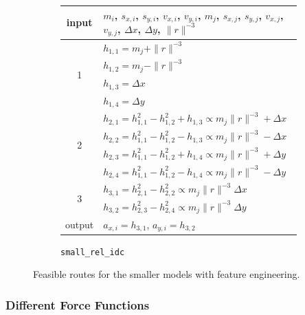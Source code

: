 \documentclass{article}
\begin{document}
\begin{figure}[H]
\begin{subfigure}{\textwidth}
\centering
\begin{tabular}{c|l}
input & $m_{i}$, $s_{x,i}$, $s_{y,i}$, $v_{x,i}$, $v_{y,i}$, $m_{j}$, $s_{x,j}$, $s_{y,j}$, $v_{x,j}$, $v_{y,j}$, $\Delta x$, $\Delta y$, $\|r\|^{-3}$ \\
\hline
\multirow{4}{*}{1} & $h_{1,1} = m_{j} + \|r\|^{-3}$ \\
& $h_{1,2} = m_{j} - \|r\|^{-3}$ \\
& $h_{1,3} = \Delta x$ \\
& $h_{1,4} = \Delta y$ \\
\hline
\multirow{4}{*}{2} & $h_{2, 1} = h_{1,1}^{2} - h_{1,2}^{2} + h_{1,3} \propto m_{j} \|r\|^{-3} + \Delta x$ \\
& $h_{2, 2} = h_{1,1}^{2} - h_{1,2}^{2} - h_{1,3} \propto m_{j} \|r\|^{-3} - \Delta x$ \\
& $h_{2, 3} = h_{1,1}^{2} - h_{1,2}^{2} + h_{1,4} \propto m_{j} \|r\|^{-3} + \Delta y$ \\
& $h_{2, 4} = h_{1,1}^{2} - h_{1,2}^{2} - h_{1,4} \propto m_{j} \|r\|^{-3} - \Delta y$ \\
\hline
\multirow{2}{*}{3} & $h_{3,1} = h_{2,1}^{2} - h_{2,2}^{2} \propto m_{j} \|r\|^{-3} \Delta x$ \\
& $h_{3,2} = h_{2,3}^{2} - h_{2,4}^{2} \propto m_{j} \|r\|^{-3} \Delta y$ \\
\hline
output & $a_{x,i} = h_{3,1}$, $a_{y,i} = h_{3,2}$ \\
\end{tabular}
\caption{\texttt{small\_rel\_idc}}
\label{fig:feasible-route-small-rel-idc}
\end{subfigure}

\caption{Feasible routes for the smaller models with feature engineering.}
\label{fig:feasible-routes}
\end{figure}

\subsubsection{Different Force Functions}
\end{document}

